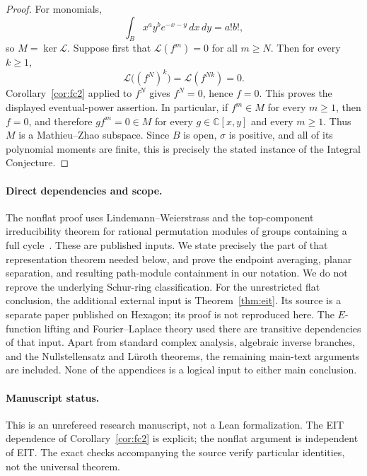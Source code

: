 \documentclass[11pt]{article}
\numberwithin{equation}{section}
\theoremstyle{definition}\newtheorem{definition}[theorem]{Definition}
\theoremstyle{remark}\newtheorem{remark}[theorem]{Remark}
\newcommand{\C}{\mathbb C}
\newcommand{\Lfac}{\mathcal L}
\newcommand{\dd}{\,d}
\begin{document}
\begin{proof}
For monomials,
\[
 \int_B x^a y^b e^{-x-y}\dd x\dd y=a!b!,
\]
so $M=\ker\Lfac$. Suppose first that
$\Lfac(f^m)=0$ for all $m\ge N$. Then for every $k\ge1$,
\[
 \Lfac\bigl((f^N)^k\bigr)=\Lfac(f^{Nk})=0.
\]
Corollary~\ref{cor:fc2} applied to $f^N$ gives $f^N=0$, hence $f=0$.
This proves the displayed eventual-power assertion. In particular, if
$f^m\in M$ for every $m\ge1$, then $f=0$, and therefore
$gf^m=0\in M$ for every $g\in\C[x,y]$ and every $m\ge1$.
Thus $M$ is a Mathieu--Zhao subspace. Since $B$ is open, $\sigma$ is
positive, and all of its polynomial moments are finite, this is precisely
the stated instance of the Integral Conjecture.
\end{proof}

\paragraph{Direct dependencies and scope.}
The nonflat proof uses Lindemann--Weierstrass and the top-component
irreducibility theorem for rational permutation modules of groups
containing a full cycle~\cite[Theorem~3.1 and Section~4.1]{PM}.
These are published inputs. We state precisely the part
of that representation theorem needed below, and prove the endpoint
averaging, planar separation, and resulting path-module containment in
our notation. We do not reprove the underlying Schur-ring classification.
For the unrestricted flat conclusion, the additional external input is
Theorem~\ref{thm:eit}. Its source is a separate paper published on Hexagon;
its proof is not reproduced here. The $E$-function lifting and
Fourier--Laplace theory used there are transitive dependencies of that
input. Apart from standard complex analysis, algebraic inverse branches,
and the Nullstellensatz and L\"uroth theorems, the remaining main-text
arguments are included. None of the appendices is a logical input to
either main conclusion.
\paragraph{Manuscript status.}
This is an unrefereed research manuscript, not a Lean formalization.
The EIT dependence of Corollary~\ref{cor:fc2} is explicit; the nonflat
argument is independent of EIT. The exact checks accompanying the source
verify particular identities, not the universal theorem.
\end{document}
